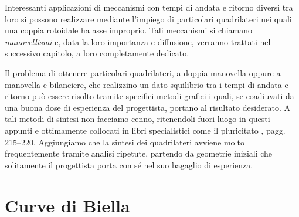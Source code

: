 \noindent Interessanti applicazioni di meccanismi con tempi di andata e ritorno diversi
tra loro si possono realizzare mediante l'impiego di particolari quadrilateri nei
quali una coppia rotoidale ha asse improprio. Tali meccanismi si chiamano {\em manovellismi} e, 
data la loro importanza e diffusione, verranno trattati nel successivo
capitolo, a loro completamente dedicato.

\noindent Il problema di ottenere particolari quadrilateri, a doppia manovella oppure a manovella e bilanciere, che realizzino un dato squilibrio tra i tempi di andata e 
ritorno pu\`o essere risolto tramite specifici metodi
grafici i quali, se coadiuvati da una buona dose di esperienza del progettista,
portano al risultato desiderato.
A tali metodi di sintesi non facciamo cenno, ritenendoli
fuori luogo in questi appunti e ottimamente collocati in libri specialistici come il
pluricitato \cite{ruggieri}, pagg. 215--220. Aggiungiamo che la sintesi dei quadrilateri
avviene molto frequentemente tramite analisi ripetute, partendo da geometrie iniziali
che solitamente il progettista porta con s\'e nel suo bagaglio di esperienza.

\section{Curve di Biella}

